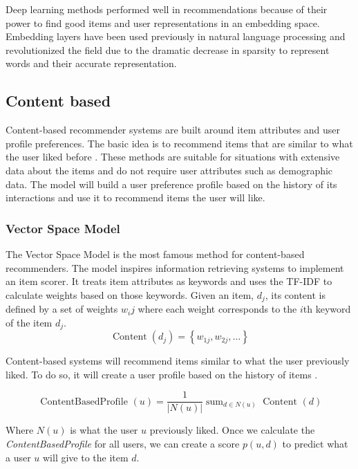 \documentclass{kththesis}
\begin{document}
Deep learning methods performed well in recommendations because of their power to find good items and user representations in an embedding space. Embedding layers have been used previously in natural language processing and revolutionized the field due to the dramatic decrease in sparsity to represent words and their accurate representation.

\subsection{Content based}
Content-based recommender systems are built around item attributes and user profile preferences. The basic idea is to recommend items that are similar to what the user liked before \cite{contentbased}. These methods are suitable for situations with extensive data about the items and do not require user attributes such as demographic data. The model will build a user preference profile based on the history of its interactions and use it to recommend items the user will like.

\subsubsection{Vector Space Model}
The Vector Space Model \cite{vectorspacemodel} is the most famous method for content-based recommenders. The model inspires information retrieving systems to implement an item scorer. It treats item attributes as keywords and uses the TF-IDF \cite{tfidf} to calculate weights based on those keywords. Given an item, $d_j$, its content is defined by a set of weights $w_ij$ where each weight corresponds to the $i$th keyword of the item $d_j$.
\begin{equation}
\operatorname{Content}\left(d_{j}\right)=\left\{w_{1 j}, w_{2 j}, \ldots\right\}
\end{equation}

Content-based systems will recommend items similar to what the user previously liked. To do so, it will create a user profile based on the history of items \cite{contentprofile}.

\begin{equation}
\text { ContentBasedProfile }(u)=\frac{1}{|N(u)|} \operatorname{sum}_{d \in N(u)} \text { Content }(d)
\end{equation}

Where $N(u)$ is what the user $u$ previously liked. Once we calculate the \textit{ContentBasedProfile} for all users, we can create a score $p(u,d)$ to predict what a user $u$ will give to the item $d$.
\end{document}
